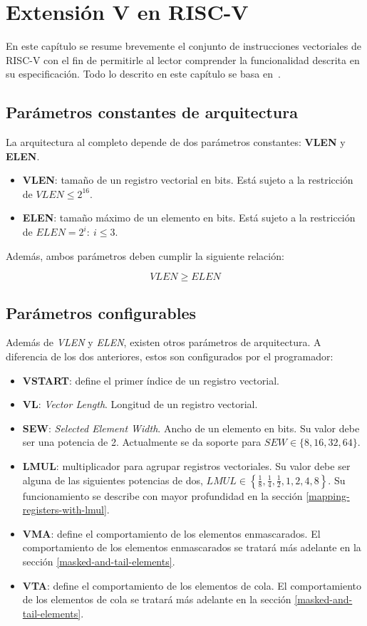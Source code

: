 \chapter{Extensión V en RISC-V}\label{chap:v-extenssion}

En este capítulo se resume brevemente el conjunto de instrucciones vectoriales
de RISC-V con el fin de permitirle al lector comprender la
funcionalidad descrita en su especificación. Todo lo descrito en este capítulo se basa en~\cite{riscv-isa2024}.

\section{Parámetros constantes de arquitectura}

La arquitectura al completo depende de dos parámetros constantes: \textbf{VLEN} y \textbf{ELEN}.
\begin{itemize}
    \item \textbf{VLEN}: tamaño de un registro vectorial en bits. Está sujeto a la restricción de $VLEN \le 2^{16}$.
    \item \textbf{ELEN}: tamaño máximo de un elemento en bits. Está sujeto a la restricción de $ELEN = 2^i:\ i\le 3$.
\end{itemize}

Además, ambos parámetros deben cumplir la siguiente relación:

$$VLEN \ge ELEN$$

\section{Parámetros configurables}\label{conf-parameters}

Además de \textit{VLEN} y \textit{ELEN}, existen otros parámetros de arquitectura. A diferencia de los dos anteriores, estos son configurados por el programador:
\begin{itemize}
    \item\textbf{VSTART}: define el primer índice de un registro vectorial.
    \item\textbf{VL}: \textit{Vector Length}. Longitud de un registro vectorial.
    \item\textbf{SEW}: \textit{Selected Element Width}. Ancho de un elemento en bits. Su valor debe ser una potencia de 2. Actualmente se da soporte para $SEW\in \{8, 16, 32, 64\}$.
    \item\textbf{LMUL}: multiplicador para agrupar registros vectoriales. Su valor debe ser alguna de las siguientes potencias de dos, $LMUL \in \left\{\frac18,\frac14,\frac12, 1, 2, 4, 8\right\}$. Su funcionamiento se describe con mayor profundidad en la sección \ref{mapping-registers-with-lmul}.
    \item\textbf{VMA}: define el comportamiento de los elementos enmascarados. El comportamiento de los elementos enmascarados se tratará más adelante en la sección \ref{masked-and-tail-elements}.
    \item\textbf{VTA}: define el comportamiento de los elementos de cola. El comportamiento de los elementos de cola se tratará más adelante en la sección \ref{masked-and-tail-elements}.
\end{itemize}


